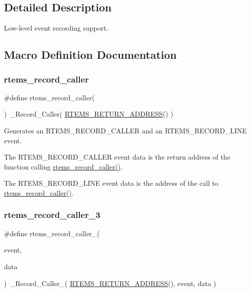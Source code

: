 \subsection{Detailed Description}
Low-\/level event recording support. 



\subsection{Macro Definition Documentation}
\mbox{\label{group__RTEMSRecord_gad89cfc2dd4b452228639eb2c976aff36}} 
\subsubsection{\texorpdfstring{rtems\_record\_caller}{rtems\_record\_caller}}
{\footnotesize\ttfamily \#define rtems\+\_\+record\+\_\+caller(\begin{DoxyParamCaption}{ }\end{DoxyParamCaption})~\+\_\+\+Record\+\_\+\+Caller( \mbox{\hyperlink{group__RTEMSScoreBaseDefs_ga70a1b8869a1ec49d30613af22ebc3f50}{R\+T\+E\+M\+S\+\_\+\+R\+E\+T\+U\+R\+N\+\_\+\+A\+D\+D\+R\+E\+SS}}() )}



Generates an R\+T\+E\+M\+S\+\_\+\+R\+E\+C\+O\+R\+D\+\_\+\+C\+A\+L\+L\+ER and an R\+T\+E\+M\+S\+\_\+\+R\+E\+C\+O\+R\+D\+\_\+\+L\+I\+NE event. 

The R\+T\+E\+M\+S\+\_\+\+R\+E\+C\+O\+R\+D\+\_\+\+C\+A\+L\+L\+ER event data is the return address of the function calling \mbox{\hyperlink{group__RTEMSRecord_gad89cfc2dd4b452228639eb2c976aff36}{rtems\+\_\+record\+\_\+caller()}}.

The R\+T\+E\+M\+S\+\_\+\+R\+E\+C\+O\+R\+D\+\_\+\+L\+I\+NE event data is the address of the call to \mbox{\hyperlink{group__RTEMSRecord_gad89cfc2dd4b452228639eb2c976aff36}{rtems\+\_\+record\+\_\+caller()}}. \mbox{\label{group__RTEMSRecord_gae9a52731b848ed38623ed5b658d14086}} 
\subsubsection{\texorpdfstring{rtems\_record\_caller\_3}{rtems\_record\_caller\_3}}
{\footnotesize\ttfamily \#define rtems\+\_\+record\+\_\+caller\+\_(\begin{DoxyParamCaption}\item[{}]{event,  }\item[{}]{data }\end{DoxyParamCaption})~\+\_\+\+Record\+\_\+\+Caller\+\_( \mbox{\hyperlink{group__RTEMSScoreBaseDefs_ga70a1b8869a1ec49d30613af22ebc3f50}{R\+T\+E\+M\+S\+\_\+\+R\+E\+T\+U\+R\+N\+\_\+\+A\+D\+D\+R\+E\+SS}}(), event, data )}



